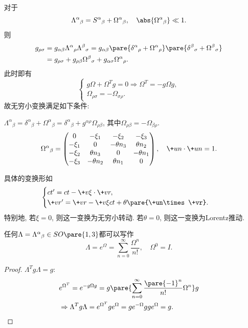 \documentclass[hidelinks]{ctexart}
\begin{document}
对于
\[ {\Lambda^\alpha}_\beta = {S^\alpha}_\beta + {\Omega^\alpha}_\beta,\quad \abs{{\Omega^\alpha}_\beta} \ll 1. \]
则
\begin{align*}
    g_{\rho\sigma} &= g_{\alpha\beta}{\Lambda^\alpha}_\rho {\Lambda^\beta}_\sigma = g_{\alpha\beta}\pare{{\delta^\alpha}_\rho + {\Omega^\alpha}_\rho}\pare{{\delta^\beta}_\sigma + {\Omega^\beta}_\sigma} \\
    &= g_{\rho\sigma} + g_{\rho\beta}{\Omega^\beta}_\sigma + g_{\alpha\sigma} {\Omega^\alpha}_\rho.
\end{align*}
此时即有
\[ \begin{cases}
    g\Omega + \Omega^T g = 0 \Rightarrow \Omega^T = -g\Omega g, \\
    \Omega_{\rho\sigma} = -\Omega_{\sigma\rho}.
\end{cases} \]
故无穷小变换满足如下条件:
\begin{cenum}
    \item ${\Lambda^\alpha}_\beta = {\delta^\alpha}_\beta + {\Omega^\alpha}_\beta = {\delta^\alpha}_\beta + g^{\alpha\rho} \Omega_{\rho\beta}$, 其中$\Omega_{\rho\beta} = -\Omega_{\beta\rho}$.
    \[ {\Omega^\alpha}_\beta = \begin{pmatrix}
        0 & -\xi_1 & -\xi_2 & -\xi_3 \\
        -\xi_1 & 0 & -\theta n_3 & \theta n_2 \\
        -\xi_2 & \theta n_3 & 0 & -\theta n_1 \\
        -\xi_3 & -\theta n_2 & \theta n_1 & 0
    \end{pmatrix},\quad \+un\cdot \+un = 1. \]
    \item 具体的变换形如
    \[ \begin{cases}
        ct' = ct - \+v\xi \cdot \+vr, \\
        \+vr' = \+vr - \+v\xi ct + \theta\pare{\+un\times \+vr}.
    \end{cases} \]
    特别地, 若$\xi = 0$, 则这一变换为无穷小转动. 若$\theta = 0$, 则这一变换为Lorentz推动.
\end{cenum}
\begin{theorem}
    任何$\Lambda = {\Lambda^\alpha}_\beta \in SO\pare{1,3}$都可以写作
    \[ \Lambda = e^{\Omega} = \sum_{n=0}^\infty \frac{\Omega^n}{n!},\quad \Omega^0 = I. \]
\end{theorem}
\begin{proof}
    $\Lambda^T g \Lambda = g$:
    \begin{align*}
        & e^{\Omega^T} = e^{-g\Omega g} = g\pare{\sum_{n=0}^\infty \frac{\pare{-1}^n}{n!}\Omega^n}g \\
        & \Rightarrow \Lambda^T g\Lambda = e^{\Omega^T} g e^{\Omega} = ge^{-\Omega}gge^{\Omega} = g. \qedhere
    \end{align*}
\end{proof}
\end{document}
